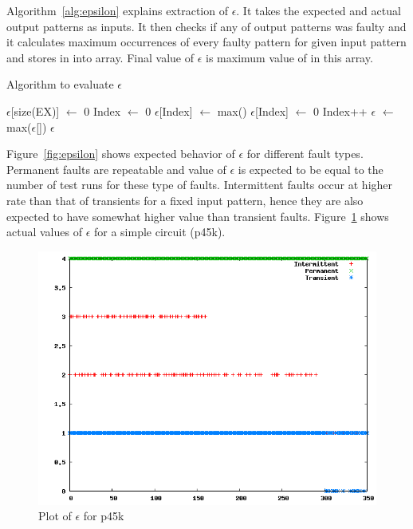 Algorithm~\ref{alg:epsilon} explains extraction of $\epsilon$. It takes the expected and actual output patterns as inputs. It then checks if any of output patterns was faulty and it calculates maximum occurrences of every faulty pattern for given input pattern and stores in into array. Final value of $\epsilon$ is maximum value of in this array.

\begin{algorithm}[H]
  \caption{Algorithm to evaluate $\epsilon$}
  \label{alg:epsilon}
  \begin{algorithmic}
 \State $\epsilon$[size(EX)] $\leftarrow$ 0\;
 \State Index $\leftarrow$ 0\;
   \State $\epsilon$[Index] $\leftarrow$ max()\;
  \Else
   \State $\epsilon$[Index] $\leftarrow$ 0\;
  \EndIf
  \State Index++\;
 \EndWhile
 \State$\epsilon$ $\leftarrow$ max($\epsilon$[])\;
 \State \Return $\epsilon$\;
 \EndProcedure
 \end{algorithmic}
\end{algorithm}

Figure~\ref{fig:epsilon} shows expected behavior of $\epsilon$ for different fault types. Permanent faults are repeatable and value of $\epsilon$ is expected to be equal to the number of test runs for these type of faults. Intermittent faults occur at higher rate than that of transients for a fixed input pattern, hence they are also expected to have somewhat higher value than transient faults. Figure~\ref{fig:epsilonp45k} shows actual values of $\epsilon$ for a simple circuit (p45k).

\begin{figure}[h]
  \begin{center}
    \captionsetup{justification=centering}
    \includegraphics[scale=0.35]{figures/epsilonp45k.png}
    \caption{Plot of $\epsilon$ for p45k}
    \label{fig:epsilonp45k}
  \end{center}
\end{figure}

